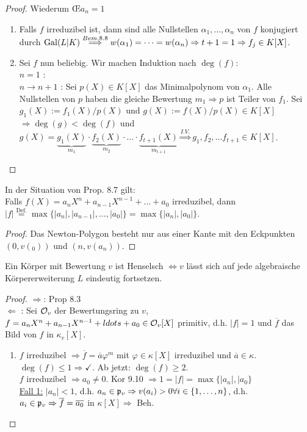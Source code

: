 \begin{proof}
Wiederum \OE $a_n=1$
\begin{enumerate}[(1)]
\item Falls $f$ irreduzibel ist, dann sind alle Nullstellen $\alpha_1, \dots, \alpha_n$ von $f$ konjugiert durch $\operatorname{Gal}(L|K) \stackrel{Bem. 8.8}{\Longrightarrow} w(\alpha_1)=\dots=w(\alpha_n) \Rightarrow t+1=1 \Rightarrow f_j \in K[X]$.
\item Sei $f$ nun beliebig. Wir machen Induktion nach $\deg(f)$:\\
\glqq $n=1$ \grqq: \checkmark\\
\glqq $n \to n+1$ \grqq: Sei $p(X) \in K[X]$ das Minimalpolynom von $\alpha_1$. Alle Nullstellen von $p$ haben die gleiche Bewertung $m_1 \Rightarrow p$ ist Teiler von $f_1$. Sei $g_1(X):= f_1(X)/p(X)$ und $g(X):=f(X)/p(X) \in K[X]$\\
$\Rightarrow \deg(g) < \deg(f)$ und $g(X)=\underbrace{g_1(X)}_{m_1} \cdot \underbrace{f_2(X)}_{m_2} \cdot \ldots \cdot \underbrace{f_{t+1}(X)}_{m_{t+1}} \stackrel{I.V.}{\Rightarrow} g_1, f_2, \dots f_{t+1} \in K[X]$.
\end{enumerate}
\end{proof}

\begin{Kor}
In der Situation von Prop. 8.7 gilt:\\
Falls $f(X)=a_n X^n + a_{n-1}X^{n-1} + \dots + a_0$ irreduzibel, dann $|f| \stackrel{\text{Def.}}{=} \max\{|a_n|, |a_{n-1}|, \dots, |a_0|\}=\max\{|a_n|, |a_0|\}$.
\end{Kor}

\begin{proof}
Das Newton-Polygon besteht nur aus einer Kante mit den Eckpunkten $(0, v(_0))$ und $(n, v(a_n))$.
\end{proof}

\begin{Prop}
Ein Körper mit Bewertung $v$ ist Henselsch $\iff v$ lässt sich auf jede algebraische Körpererweiterung $L$ eindeutig fortsetzen.
\end{Prop}

\begin{proof}
\glqq $\Rightarrow$\grqq: Prop 8.3\\
\glqq $\Leftarrow$ \grqq: Sei $\mathcal{O}_v$ der Bewertungsring zu $v$, $f=a_nX^n+a_{n-1}X^{n-1}+ \-ldots+a_0 \in \mathcal{O}_v[X]$ primitiv, d.h. $|f|=1$ und $\overline{f}$ das Bild von $f$ in $\kappa_v[X]$.
\begin{enumerate}[(1)]
\item $f$ irreduzibel $\Rightarrow \overline{f}=\overline{a} \varphi^m$ mit $\varphi \in \kappa[X]$ irreduzibel und $\overline{a} \in \kappa$.\\
$\deg(f) \leq 1 \Rightarrow \checkmark$. Ab jetzt: $\deg(f) \geq 2$.\\
$f$ irreduzibel $\Rightarrow  a_0 \neq 0$. Kor 9.10 $\Rightarrow 1=|f|=\max\{|a_n|, |a_0\}$\\
\underline{Fall 1:} $|a_n|<1$, d.h. $a_n \in \mathfrak{p}_v \Rightarrow v(a_i)>0 \forall i \in \{1, \ldots, n\}$, d.h. $a_i \in \mathfrak{p}_v \Rightarrow \overline{f}= \overline{a_0}$ in $\kappa[X] \Rightarrow$ Beh.
\end{enumerate}
\end{proof}
